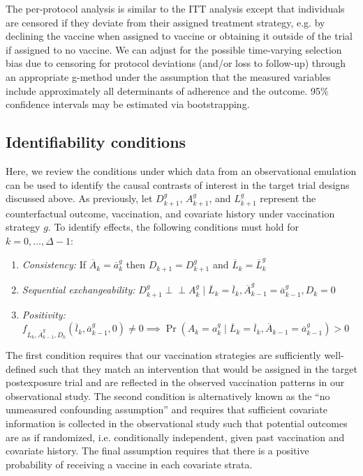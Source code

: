 \begin{appendices}
\begin{refsection}
    The per-protocol analysis is similar to the ITT analysis except that individuals are censored if they deviate from their assigned treatment strategy, e.g. by declining the vaccine when assigned to vaccine or obtaining it outside of the trial if assigned to no vaccine. We can adjust for the possible time-varying selection bias due to censoring for protocol deviations (and/or loss to follow-up) through an appropriate g-method under the assumption that the measured variables include approximately all determinants of adherence and the outcome. 95\% confidence intervals may be estimated via bootstrapping.

    \clearpage
    \subsection{Identifiability conditions}\label{sec:identifiability}
    Here, we review the conditions under which data from an observational emulation can be used to identify the causal contrasts of interest in the target trial designs discussed above. As previously, let $D^g_{k+1}$, $A^g_{k+1}$, and $L^g_{k+1}$ represent the counterfactual outcome, vaccination, and covariate history under vaccination strategy $g$. To identify effects, the following conditions must hold for $k = 0, \ldots, \Delta - 1$: 
    \begin{enumerate}
        \item \textit{Consistency:} If $\overline{A}_k = \overline{a}_k^g$ then $D_{k+1} = D^g_{k+1}$ and $\overline{L}_{k} = \overline{L}^g_{k}$
        \item \textit{Sequential exchangeability:} $D^g_{k+1} \perp \!\!\! \perp A^g_k \mid \overline{L}_k = \overline{l}_k, \overline{A}^g_{k-1} = \overline{a}_{k-1}^g, D_k = 0$
        \item \textit{Positivity:} $f_{\overline{L}_k,\overline{A}^g_{k-1},D_k}(\overline{l}_k, \overline{a}_{k-1}^g, 0) \neq 0 \implies \Pr(A_k = a^g_k \mid \overline{L}_k = \overline{l}_k, \overline{A}_{k -1} = \overline{a}^g_{k-1}) > 0$ 
    \end{enumerate}
    The first condition requires that our vaccination strategies are sufficiently well-defined such that they match an intervention that would be assigned in the target postexposure trial and are reflected in the observed vaccination patterns in our observational study. The second condition is alternatively known as the ``no unmeasured confounding assumption'' and requires that sufficient covariate information is collected in the observational study such that potential outcomes are as if randomized, i.e. conditionally independent, given past vaccination and covariate history. The final assumption requires that there is a positive probability of receiving a vaccine in each covariate strata.


\end{refsection}
\end{appendices}
